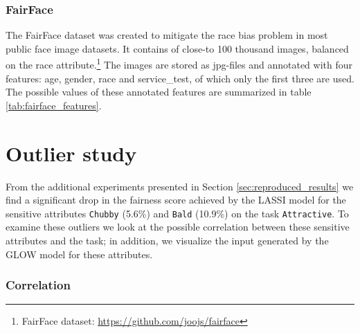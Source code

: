 \subsubsection{FairFace}

The FairFace dataset \cite{karkkainen2021fairface} was created to mitigate the race bias problem in most public face image datasets. It contains of close-to 100 thousand images, balanced on the race attribute.\footnote{FairFace dataset: \url{https://github.com/joojs/fairface}} The images are stored as jpg-files and annotated with four features: age, gender, race and service\_test, of which only the first three are used. The possible values of these annotated features are summarized in table \ref{tab:fairface_features}.

\begin{table}[H]
\centering
{}
\caption{\label{tab:fairface_features} Summary of the possible feature values in the fairface dataset.}
\end{table}

\section{Outlier study} \label{sec:appendix_outliers}

From the additional experiments presented in Section \ref{sec:reproduced_results} we find a significant drop in the fairness score achieved by the LASSI model for the sensitive attributes \texttt{Chubby} (5.6\%) and \texttt{Bald} (10.9\%) on the task \texttt{Attractive}. To examine these outliers we look at the possible correlation between these sensitive attributes and the task; in addition, we visualize the input generated by the GLOW model for these attributes. \newline

\subsubsection{Correlation} 

